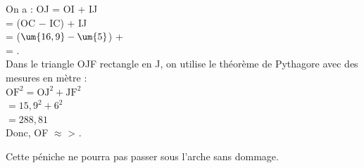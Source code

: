 \begin{corrige}
\begin{enumerate}
\begin{minipage}{8cm}
            On a : OJ = OI + IJ \\
            \hspace*{1.35cm} = (OC $-$ IC) + IJ \\
            \hspace*{1.35cm} = ($\um{16,9}-\um{5}$) +  \\
            \hspace*{1.35cm} = . \\ [2mm]
            Dans le triangle OJF rectangle en J, on utilise le théorème de Pythagore avec des mesures en mètre : \\
            $\text{OF}^2 = \text{OJ}^2 + \text{JF}^2$ \\
            \hspace*{0.65cm}  $= 15,9^2 + 6^2$ \\
            \hspace*{0.65cm}  $= 288,81$ \\
            Donc, OF $\approx$  > .
         \end{minipage}
      {\blue Cette péniche ne pourra pas passer sous l'arche sans dommage}.
   \end{enumerate}
\end{corrige}


